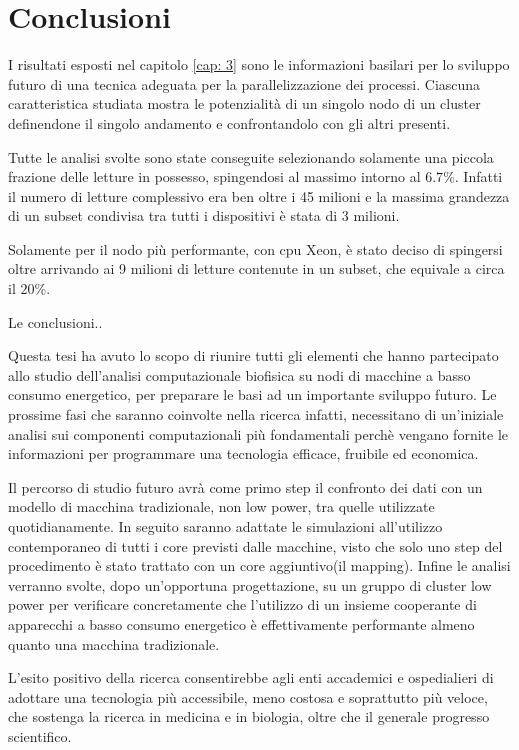 \chapter{Conclusioni}
I risultati esposti nel capitolo \ref{cap: 3} sono le informazioni basilari per lo sviluppo futuro di una tecnica adeguata per la parallelizzazione dei processi.
Ciascuna caratteristica studiata mostra le potenzialità di un singolo nodo di un cluster definendone il singolo andamento e confrontandolo con gli altri presenti.

Tutte le analisi svolte sono state conseguite selezionando solamente una piccola frazione delle letture in possesso, spingendosi al massimo intorno al $6.7\%$. 
Infatti il numero di letture complessivo era ben oltre i 45 milioni e la massima grandezza di un subset condivisa tra tutti i dispositivi è stata di 3 milioni.

Solamente per il nodo più performante, con cpu Xeon, è stato deciso di spingersi oltre arrivando ai 9 milioni di letture contenute in un subset, che equivale a circa il $20\%$. 

Le conclusioni..

Questa tesi ha avuto lo scopo di riunire tutti gli elementi che hanno partecipato allo studio dell'analisi computazionale biofisica su nodi di macchine a basso consumo energetico, per preparare le basi ad un importante sviluppo futuro.  
Le prossime fasi che saranno coinvolte nella ricerca infatti, necessitano di un'iniziale analisi sui componenti computazionali più fondamentali perchè vengano fornite le informazioni per programmare una tecnologia efficace, fruibile ed economica.

Il percorso di studio futuro avrà come primo step il confronto dei dati con un modello di macchina tradizionale, non low power, tra quelle utilizzate quotidianamente.
In seguito saranno adattate le simulazioni all'utilizzo contemporaneo di tutti i core previsti dalle macchine, visto che solo uno step del procedimento è stato trattato con un core aggiuntivo(il mapping).
Infine le analisi verranno svolte, dopo un'opportuna progettazione, su un gruppo di cluster low power per verificare concretamente che l'utilizzo di un insieme cooperante di apparecchi a basso consumo energetico è effettivamente performante almeno quanto una macchina tradizionale.

L'esito positivo della ricerca consentirebbe agli enti accademici e ospedialieri di adottare una tecnologia più accessibile, meno costosa e soprattutto più veloce, che sostenga la ricerca in medicina e in biologia, oltre che il generale progresso scientifico.


